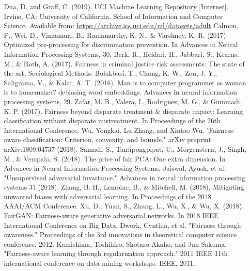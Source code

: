 \documentclass[conference]{IEEEtran}
\begin{document}
\begin{thebibliography}{9}
Dua, D. and Graff, C. (2019). UCI Machine Learning Repository [Internet]. Irvine, CA: University of California, School of Information and Computer Science. Available from: \url{https://archive.ics.uci.edu/ml/datasets/adult}
Calmon, F., Wei, D., Vinzamuri, B., Ramamurthy, K. N., \& Varshney, K. R. (2017). Optimized pre-processing for discrimination prevention. In Advances in Neural Information Processing Systems, 30.
Berk, R., Heidari, H., Jabbari, S., Kearns, M., \& Roth, A. (2017). Fairness in criminal justice risk assessments: The state of the art. Sociological Methods.
Bolukbasi, T., Chang, K. W., Zou, J. Y., Saligrama, V., \& Kalai, A. T. (2016). Man is to computer programmer as woman is to homemaker? debiasing word embeddings. Advances in neural information processing systems, 29.
Zafar, M. B., Valera, I., Rodriguez, M. G., \& Gummadi, K. P. (2017). Fairness beyond disparate treatment \& disparate impact: Learning classification without disparate mistreatment. In Proceedings of the 26th International Conference.
Wu, Yongkai, Lu Zhang, and Xintao Wu. "Fairness-aware classification: Criterion, convexity, and bounds." arXiv preprint arXiv:1809.04737 (2018).
Samadi, S., Tantipongpipat, U., Morgenstern, J., Singh, M., \& Vempala, S. (2018). The price of fair PCA: One extra dimension. In Advances in Neural Information Processing Systems.
Jaiswal, Ayush, et al. "Unsupervised adversarial invariance." Advances in neural information processing systems 31 (2018).
Zhang, B. H., Lemoine, B., \& Mitchell, M. (2018). Mitigating unwanted biases with adversarial learning. In Proceedings of the 2018 AAAI/ACM Conference.
Xu, D., Yuan, S., Zhang, L., Wu, X., \& Wu, X. (2018). FairGAN: Fairness-aware generative adversarial networks. In 2018 IEEE International Conference on Big Data.
Dwork, Cynthia, et al. "Fairness through awareness." Proceedings of the 3rd innovations in theoretical computer science conference. 2012.
Kamishima, Toshihiro, Shotaro Akaho, and Jun Sakuma. "Fairness-aware learning through regularization approach." 2011 IEEE 11th international conference on data mining workshops. IEEE, 2011.

\end{thebibliography}
\end{document}
